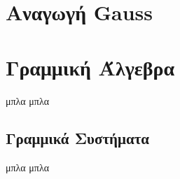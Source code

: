 \section{Αναγωγή \lt Gauss}
\section{Γραμμική Άλγεβρα}
μπλα μπλα
\subsection{Γραμμικά Συστήματα}
μπλα μπλα



